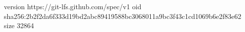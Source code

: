 version https://git-lfs.github.com/spec/v1
oid sha256:2b2f2da6f333d19bd2abc89419588bc3068011a9bc3f43c1cd1069b6e2f83e62
size 32864
